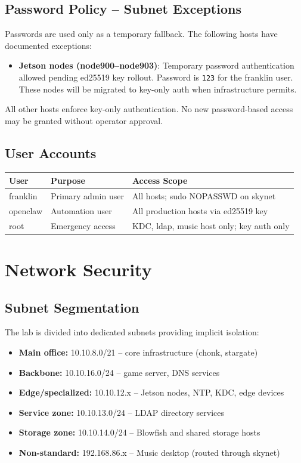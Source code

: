 \subsection{Password Policy -- Subnet Exceptions}

Passwords are used only as a temporary fallback. The following hosts have documented exceptions:

\begin{itemize}
    \item \textbf{Jetson nodes (node900--node903)}: Temporary password authentication allowed pending ed25519 key rollout. Password is \texttt{123} for the franklin user. These nodes will be migrated to key-only auth when infrastructure permits.
\end{itemize}

All other hosts enforce key-only authentication. No new password-based access may be granted without operator approval.

\subsection{User Accounts}

\begin{center}
\begin{tabular}{lll}
  \hline
  \textbf{User} & \textbf{Purpose} & \textbf{Access Scope} \\ \hline
  franklin & Primary admin user & All hosts; sudo NOPASSWD on skynet \\
  openclaw & Automation user & All production hosts via ed25519 key \\
  root & Emergency access & KDC, ldap, music host only; key auth only \\ \hline
\end{tabular}
\end{center}

\section{Network Security}

\subsection{Subnet Segmentation}
The lab is divided into dedicated subnets providing implicit isolation:

\begin{itemize}
  \item \textbf{Main office:} 10.10.8.0/21 -- core infrastructure (chonk, stargate)
  \item \textbf{Backbone:} 10.10.16.0/24 -- game server, DNS services
  \item \textbf{Edge/specialized:} 10.10.12.x -- Jetson nodes, NTP, KDC, edge devices
  \item \textbf{Service zone:} 10.10.13.0/24 -- LDAP directory services
  \item \textbf{Storage zone:} 10.10.14.0/24 -- Blowfish and shared storage hosts
  \item \textbf{Non-standard:} 192.168.86.x -- Music desktop (routed through skynet)
\end{itemize}

